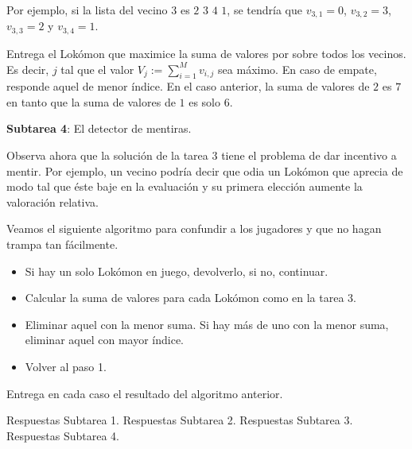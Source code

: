 \documentclass{oci}
\begin{document}
\begin{outputDescription}
Por ejemplo, si la lista del vecino $3$ es $2$ $3$ $4$ $1$, se tendr\'ia que $v_{3,1} = 0$, $v_{3,2} = 3$, $v_{3,3} = 2$ y $v_{3,4} = 1$.

Entrega el Lok\'omon que maximice la suma de valores por sobre todos los vecinos. Es decir, $j$ tal que el valor $V_{j} := \sum_{i = 1}^{M}v_{i,j}$ sea m\'aximo. En caso de empate, responde aquel de menor \'indice. En el caso anterior, la suma de valores de $2$ es $7$ en tanto que la suma de valores de $1$ es solo $6$.

\begin{sampleDescription}
\end{sampleDescription}

\textbf{Subtarea 4}: El detector de mentiras.

Observa ahora que la soluci\'on de la tarea 3 tiene el problema de dar incentivo a mentir. Por ejemplo, un vecino podr\'ia decir que odia un Lok\'omon que aprecia de modo tal que \'este baje en la evaluaci\'on y su primera elecci\'on aumente la valoraci\'on relativa. 

Veamos el siguiente algoritmo para confundir a los jugadores y que no hagan trampa tan f\'acilmente.

\begin{itemize}
	\item Si hay un solo Lok\'omon en juego, devolverlo, si no, continuar.
	\item Calcular la suma de valores para cada Lok\'omon como en la tarea 3.
	\item Eliminar aquel con la menor suma. Si hay m\'as de uno con la menor suma, eliminar aquel con mayor \'indice.
	\item Volver al paso 1.
\end{itemize}

Entrega en cada caso el resultado del algoritmo anterior.

\begin{sampleDescription}
\end{sampleDescription}

\end{outputDescription}

\begin{scoreDescription}
   Respuestas Subtarea 1.
   Respuestas Subtarea 2.
   Respuestas Subtarea 3.
   Respuestas Subtarea 4.
\end{scoreDescription}
\end{document}
